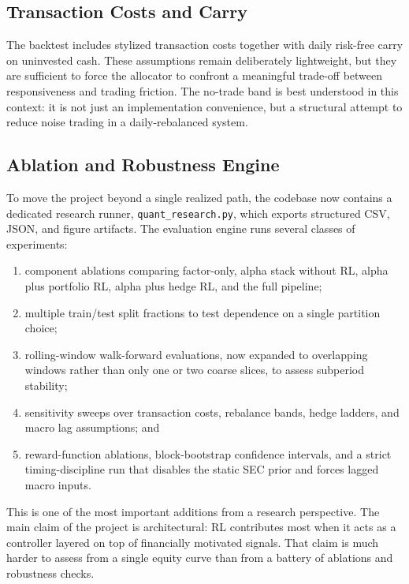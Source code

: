 \documentclass[10pt,twocolumn]{article}
\begin{document}
\subsection{Transaction Costs and Carry}

The backtest includes stylized transaction costs together with daily risk-free
carry on uninvested cash. These assumptions remain deliberately lightweight, but
they are sufficient to force the allocator to confront a meaningful trade-off
between responsiveness and trading friction. The no-trade band is best
understood in this context: it is not just an implementation convenience, but a
structural attempt to reduce noise trading in a daily-rebalanced system.

\subsection{Ablation and Robustness Engine}

To move the project beyond a single realized path, the codebase now contains a
dedicated research runner, \texttt{quant\_research.py}, which exports structured
CSV, JSON, and figure artifacts. The evaluation engine runs several classes of
experiments:
\begin{enumerate}[leftmargin=1.5em, itemsep=2pt, topsep=4pt]
\item component ablations comparing factor-only, alpha stack without RL,
      alpha plus portfolio RL, alpha plus hedge RL, and the full pipeline;
\item multiple train/test split fractions to test dependence on a single
      partition choice;
\item rolling-window walk-forward evaluations, now expanded to overlapping
      windows rather than only one or two coarse slices, to assess subperiod
      stability;
\item sensitivity sweeps over transaction costs, rebalance bands, hedge ladders,
      and macro lag assumptions; and
\item reward-function ablations, block-bootstrap confidence intervals, and a
      strict timing-discipline run that disables the static SEC prior and
      forces lagged macro inputs.
\end{enumerate}

This is one of the most important additions from a research perspective. The
main claim of the project is architectural: RL contributes most when it acts as
a controller layered on top of financially motivated signals. That claim is much
harder to assess from a single equity curve than from a battery of ablations and
robustness checks.
\end{document}
